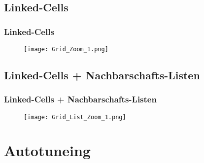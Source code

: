 \documentclass[compress]{beamer}
\begin{document}
\subsection{Linked-Cells}
\begin{frame}
	\frametitle{Linked-Cells}
	\begin{figure}
		\begin{center}
			\texttt{[image: Grid\_Zoom\_1.png]}
		\end{center}
	\end{figure}
\end{frame}
\subsection{Linked-Cells + Nachbarschafts-Listen}
\begin{frame}
	\frametitle{Linked-Cells + Nachbarschafts-Listen}
	\begin{figure}
		\begin{center}
			\texttt{[image: Grid\_List\_Zoom\_1.png]}
		\end{center}
	\end{figure}
\end{frame}
\section{Autotuneing}
\end{document}
